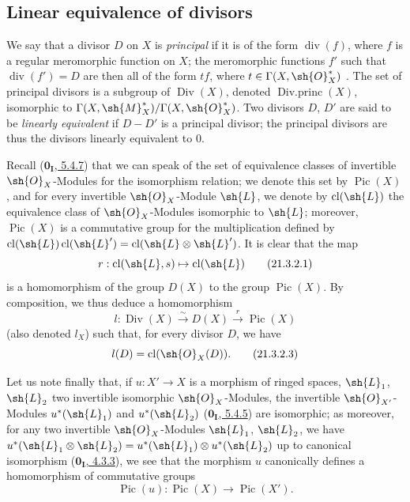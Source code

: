 
\subsection{Linear equivalence of divisors}
\label{subsection:IV.21.3}

\begin{env}[21.3.1]
\label{IV.21.3.1}
We say that a divisor $D$ on $X$ is \emph{principal} if it is of the form $\operatorname{div}(f)$, where $f$ is a regular meromorphic function on $X$;
the meromorphic functions $f'$ such that $\operatorname{div}(f')=D$ are then all of the form $tf$, where $t\in\Gamma(X,\sh{O}_X^*)$ .
The set of principal divisors is a subgroup of $\operatorname{Div}(X)$, denoted $\operatorname{Div.princ}(X)$, isomorphic to $\Gamma(X,\sh{M}_X^*)/\Gamma(X,\sh{O}_X^*)$.
Two divisors $D$, $D'$ are said to be \emph{linearly equivalent} if $D-D'$ is a principal divisor;
the principal divisors are thus the divisors linearly equivalent to $0$.
\end{env}

\begin{env}[21.3.2]
\label{IV.21.3.2}
Recall (\hyperref[0.5.4.7]{$\mathbf{0_I}$, 5.4.7}) that we can speak of the set of equivalence classes of invertible $\sh{O}_X$-Modules for the isomorphism relation;
we denote this set by $\operatorname{Pic}(X)$, and for every invertible $\sh{O}_X$-Module $\sh{L}$, we denote by $\operatorname{cl}(\sh{L})$ the equivalence class of $\sh{O}_X$-Modules isomorphic to $\sh{L}$;
moreover, $\operatorname{Pic}(X)$ is a commutative group for the multiplication defined by $\operatorname{cl}(\sh{L})\operatorname{cl}(\sh{L}')=\operatorname{cl}(\sh{L}\otimes\sh{L}')$.
It is clear that the map
\[
\label{IV.21.3.2.1}
  r:\operatorname{cl}(\sh{L},s)\mapsto\operatorname{cl}(\sh{L})
  \tag{21.3.2.1}
\]
is a homomorphism of the group $D(X)$  to the group $\operatorname{Pic}(X)$.
By composition, we thus deduce a homomorphism
\[
\label{IV.21.3.2.2}
  l:\operatorname{Div}(X)\xrightarrow{\sim}D(X)\xrightarrow{r}\operatorname{Pic}(X)
  \tag{21.3.2.2}
\]
(also denoted $l_X$) such that, for every divisor $D$, we have
\[
\label{IV.21.3.2.3}
  l(D)=\operatorname{cl}(\sh{O}_X(D)).
  \tag{21.3.2.3}
\]

Let us note finally that, if $u:X'\to X$ is a morphism of ringed spaces, $\sh{L}_1$, $\sh{L}_2$ two invertible isomorphic $\sh{O}_X$-Modules, the invertible $\sh{O}_{X'}$-Modules $u^*(\sh{L}_1)$ and $u^*(\sh{L}_2)$ (\hyperref[0.5.4.5]{$\mathbf{0_I}$, 5.4.5}) are isomorphic;
as moreover, for any two invertible $\sh{O}_X$-Modules $\sh{L}_1$, $\sh{L}_2$, we have $u^*(\sh{L}_1\otimes\sh{L}_2)=u^*(\sh{L}_1)\otimes u^*(\sh{L}_2)$ up to canonical isomorphism (\hyperref[0.4.3.3]{$\mathbf{0_I}$, 4.3.3}), we see that the morphism $u$ canonically defines a homomorphism of commutative groups
\[
\label{IV.21.3.2.4}
  \operatorname{Pic}(u):\operatorname{Pic}(X)\to\operatorname{Pic}(X').
  \tag{21.3.2.4}
\]
\end{env}

